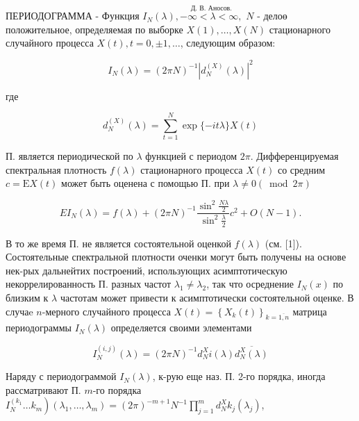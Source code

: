 \documentclass[10pt]{article}
\begin{document}
ПЕРИОДОГРАММА - Функция $I_{N}(\lambda), \stackrel{\text { Д. В. Аносов. }}{-\infty<\lambda<\infty,}$ $N$ - делоө положительное, определяемая по выборке $X(1), \ldots, X(N)$ стационарного случайного процесса $X(t), t=0, \pm 1, \ldots$, следующим образом:



\[

I_{N}(\lambda)=(2 \pi N)^{-1}\left|d_{N}^{(X)}(\lambda)\right|^{2}

\]



где



\[

d_{N}^{(X)}(\lambda)=\sum_{t=1}^{N} \exp \{-i t \lambda\} X(t)

\]



П. является периодической по $\lambda$ функцией с периодом $2 \pi$. Дифференцируемая спектральная плотность $f(\lambda)$ стационарного процесса $X(t)$ со средним $c=\mathrm{E} X(t)$ может быть оценена с помощью П. при $\lambda \neq 0(\bmod 2 \pi)$



\[

E I_{N}(\lambda)=f(\lambda)+(2 \pi N)^{-1} \frac{\sin ^{2} \frac{N \lambda}{2}}{\sin ^{2} \frac{\lambda}{2}} c^{2}+O(N-1) .

\]



В то же время П. не является состоятельной оценкой $f(\lambda)$ (см. [1]). Состоятельные спектральной плотности оченки могут быть получены на основе нек-рых дальнейтих построений, использующих асимптотическую некоррелированность П. разных частот $\lambda_{1} \neq \lambda_{2}$, так что осреднение $I_{N}(x)$ по близким к $\lambda$ частотам может привести к асимптотически состоятельной оценке. В случаe $n$-мерного случайного процесса $X(t)=\left\{X_{k}(t)\right\}_{k=\overline{1, n}}$ матрица периодограммы $I_{N}(\lambda)$ определяется своими элементами



\[

I_{N}^{(i, j)}(\lambda)=(2 \pi N)^{-1} d_{N}^{X} i(\lambda) \overline{d_{N}^{X}(\lambda)}

\]



Наряду с периодограммой $I_{N}(\lambda)$, к-рую еще наз. П. 2-го порядка, иногда рассматривают П. $m$-го порядка $\left.I_{N}^{\left(k_{1}\right.} \ldots k_{m}\right)\left(\lambda_{1}, \ldots, \lambda_{m}\right)=(2 \pi)^{-m+1} N^{-1} \prod_{j=1}^{m} d_{N}^{X} k_{j}\left(\lambda_{j}\right)$,
\end{document}

